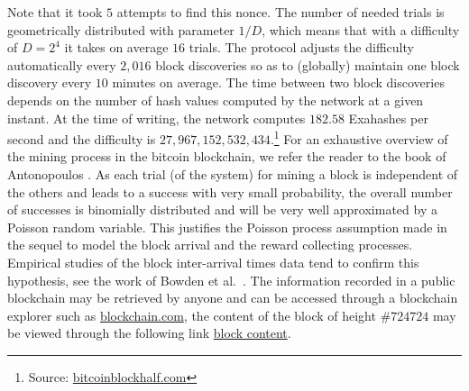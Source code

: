 Note that it took $5$ attempts to find this nonce. The number of needed trials is geometrically distributed with parameter $1 / D$, which means that with a difficulty of $D = 2^4$ it takes on average $16$ trials. The protocol adjusts the difficulty automatically every $2,016$ block discoveries so as to (globally) maintain one block discovery every $10$ minutes on average. The time between two block discoveries depends on the number of hash values computed by the network at a given instant. At the time of writing, the network computes $182.58$ Exahashes per second and the difficulty is $27,967,152,532,434$.\footnote{Source: \href{https://www.bitcoinblockhalf.com/}{bitcoinblockhalf.com}} For an exhaustive overview of the mining process in the bitcoin blockchain, we refer the reader to the book of Antonopoulos \citet[Chapter 10]{Antonopoulos2017}. As each trial (of the system) for mining a block is
independent of the others and leads to a success with very small probability, the overall
number of successes is binomially distributed and will be very well approximated by a
Poisson random variable. This justifies the Poisson process assumption made in the sequel to model the block arrival and the reward collecting processes. Empirical studies of the block inter-arrival times data tend to confirm this hypothesis, see the work of Bowden et al.\ \citet{Bowden2020}. The information recorded in a public blockchain may be retrieved by anyone and can be accessed through a blockchain explorer such as \href{https://www.blockchain.com/}{blockchain.com}, the content of the block of height $\#724724$ may be viewed through the following link \href{https://www.blockchain.com/btc/block/0000000000000000000954d42e8ced7017448cb9f39b364e371a1eec6e34463b}{block content}.\\

